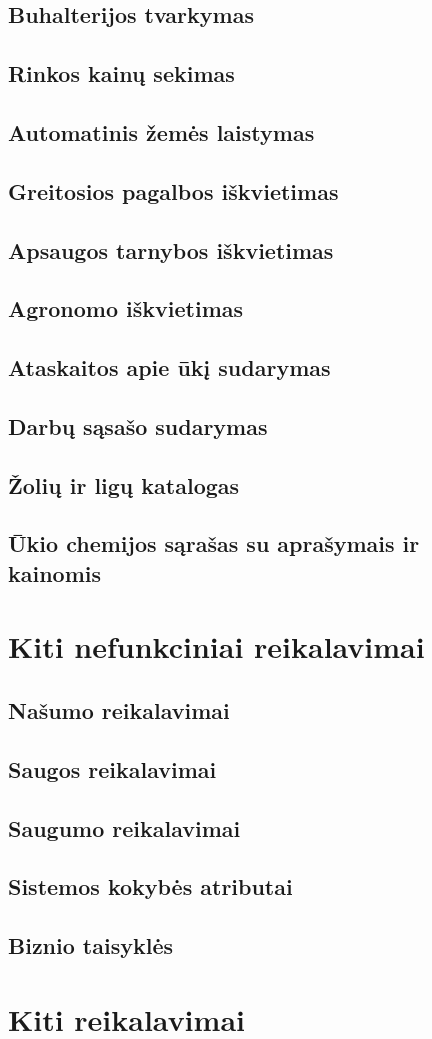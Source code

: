 \documentclass[oneside]{VUMIFPSkursinis}
\begin{document}
\subsection{Buhalterijos tvarkymas}
\subsection{Rinkos kainų sekimas}
\subsection{Automatinis žemės laistymas}
\subsection{Greitosios pagalbos iškvietimas}
\subsection{Apsaugos tarnybos iškvietimas}
\subsection{Agronomo iškvietimas}
\subsection{Ataskaitos apie ūkį sudarymas}
\subsection{Darbų sąsašo sudarymas}
\subsection{Žolių ir ligų katalogas}
\subsection{Ūkio chemijos sąrašas su aprašymais ir kainomis}

\section{Kiti nefunkciniai reikalavimai}
\subsection{Našumo reikalavimai}
\subsection{Saugos reikalavimai}
\subsection{Saugumo reikalavimai}
\subsection{Sistemos kokybės atributai}
\subsection{Biznio taisyklės}

\section{Kiti reikalavimai}
\end{document}
